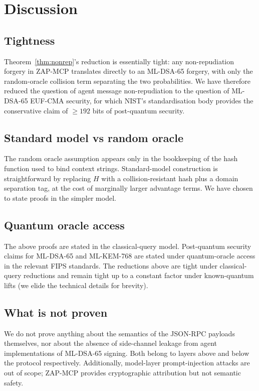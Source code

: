 \documentclass[11pt,a4paper]{article}
\theoremstyle{definition}
\theoremstyle{remark}
\newcommand{\zapmcp}{\textsf{ZAP-MCP}\xspace}
\begin{document}
\section{Discussion}

\subsection{Tightness}

Theorem~\ref{thm:nonrep}'s reduction is essentially tight: any
non-repudiation forgery in \zapmcp{} translates directly to an
ML-DSA-65 forgery, with only the random-oracle collision term
separating the two probabilities. We have therefore reduced the
question of agent message non-repudiation to the question of
ML-DSA-65 EUF-CMA security, for which NIST's standardisation body
provides the conservative claim of $\geq 192$ bits of post-quantum
security.

\subsection{Standard model vs random oracle}

The random oracle assumption appears only in the bookkeeping of the
hash function used to bind context strings. Standard-model
construction is straightforward by replacing $H$ with a
collision-resistant hash plus a domain separation tag, at the cost
of marginally larger advantage terms. We have chosen to state proofs
in the simpler model.

\subsection{Quantum oracle access}

The above proofs are stated in the classical-query model.
Post-quantum security claims for ML-DSA-65 and ML-KEM-768 are stated
under quantum-oracle access in the relevant FIPS standards. The
reductions above are tight under classical-query reductions and
remain tight up to a constant factor under known-quantum lifts
(we elide the technical details for brevity).

\subsection{What is not proven}

We do not prove anything about the semantics of the JSON-RPC payloads
themselves, nor about the absence of side-channel leakage from agent
implementations of ML-DSA-65 signing. Both belong to layers above and
below the protocol respectively. Additionally, model-layer
prompt-injection attacks are out of scope; \zapmcp{} provides
cryptographic attribution but not semantic safety.
\end{document}
